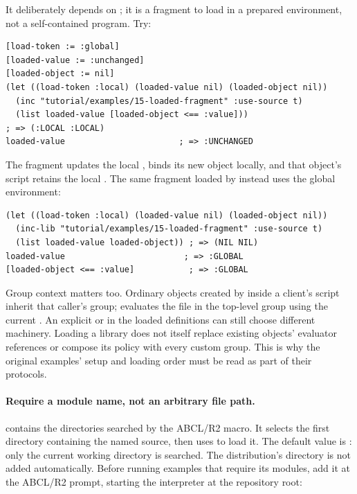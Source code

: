 It deliberately depends on ; it is a fragment to load
in a prepared environment, not a self-contained program. Try:

\begin{codeblock}
\begin{lstlisting}
[load-token := :global]
[loaded-value := :unchanged]
[loaded-object := nil]
(let ((load-token :local) (loaded-value nil) (loaded-object nil))
  (inc "tutorial/examples/15-loaded-fragment" :use-source t)
  (list loaded-value [loaded-object <== :value]))
; => (:LOCAL :LOCAL)
loaded-value                       ; => :UNCHANGED
\end{lstlisting}
\end{codeblock}

The fragment updates the local , binds its new object
locally, and that object's script retains the local .
The same fragment loaded by  instead uses the global
environment:

\begin{codeblock}
\begin{lstlisting}
(let ((load-token :local) (loaded-value nil) (loaded-object nil))
  (inc-lib "tutorial/examples/15-loaded-fragment" :use-source t)
  (list loaded-value loaded-object)) ; => (NIL NIL)
loaded-value                        ; => :GLOBAL
[loaded-object <== :value]           ; => :GLOBAL
\end{lstlisting}
\end{codeblock}

Group context matters too. Ordinary objects created by  inside
a client's script inherit that caller's group;  evaluates
the file in the top-level group using the current .
An explicit  or  in the loaded definitions
can still choose different machinery. Loading a library does not itself
replace existing objects' evaluator references or compose its policy
with every custom group. This is why the original examples' setup and
loading order must be read as part of their protocols.

\paragraph{Require a module name, not an arbitrary file path.}
\label{sec:library-path}
 contains the directories searched by the
ABCL/R2  macro. It selects the first directory containing
the named  source, then uses  to load it.
The default value is : only the current working directory
is searched. The distribution's  directory is not added
automatically. Before running examples that require its modules, add it
at the ABCL/R2 prompt, starting the interpreter at the repository root:


